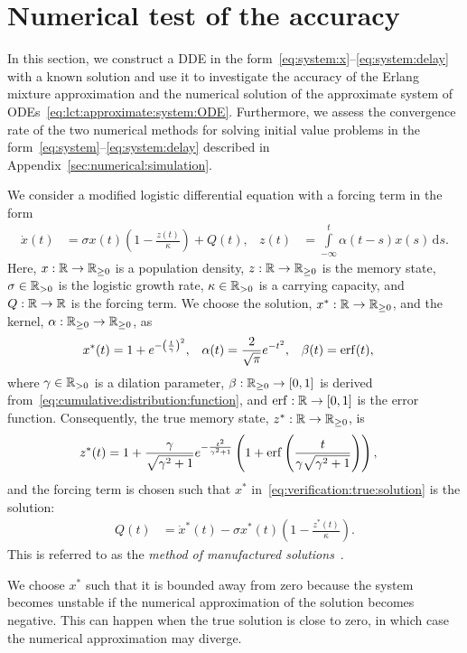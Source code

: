 \section{Numerical test of the accuracy}\label{sec:ex:conv}
In this section, we construct a DDE in the form~\eqref{eq:system:x}--\eqref{eq:system:delay} with a known solution and use it to investigate the accuracy of the Erlang mixture approximation and the numerical solution of the approximate system of ODEs~\eqref{eq:lct:approximate:system:ODE}. Furthermore, we assess the convergence rate of the two numerical methods for solving initial value problems in the form~\eqref{eq:system}--\eqref{eq:system:delay} described in Appendix~\ref{sec:numerical:simulation}.

We consider a modified logistic differential equation with a forcing term in the form
%
\begin{align}\label{eq:logistic:differential:equation}
	\dot x(t) &= \sigma x(t) \left(1 - \frac{z(t)}{\kappa}\right) + Q(t), &
	z(t) &= \int\limits_{-\infty}^{t} \alpha(t - s) x(s)\,\mathrm ds.
\end{align}
%
Here, $x: \mathbb{R} \rightarrow \mathbb{R}_{\geq 0}$ is a population density, $z: \mathbb{R} \rightarrow \mathbb{R}_{\geq 0}$ is the memory state, $\sigma \in \mathbb{R}_{> 0}$ is the logistic growth rate, $\kappa \in \mathbb{R}_{> 0}$ is a carrying capacity, and $Q: \mathbb{R} \rightarrow \mathbb{R}$ is the forcing term.
%
We choose the solution, $x^*: \mathbb{R} \rightarrow \mathbb{R}_{\geq 0}$, and the kernel, $\alpha: \mathbb{R}_{\geq 0} \rightarrow \mathbb{R}_{\geq 0}$, as
%
\begin{align}\label{eq:verification:true:solution}
	x^*(t) &= 1 + e^{-\left(\frac{t}{\gamma}\right)^2}, &
	\alpha(t) &= \frac{2}{\sqrt{\pi}} e^{-t^2}, &
	\beta (t) &= \operatorname{erf}(t),
\end{align}
%
where $\gamma \in \mathbb{R}_{> 0}$ is a dilation parameter, $\beta: \mathbb{R}_{\geq 0} \rightarrow [0, 1]$ is derived from~\eqref{eq:cumulative:distribution:function}, and $\operatorname{erf}: \mathbb{R} \rightarrow [0, 1]$ is the error function.
%
Consequently, the true memory state, $z^*: \mathbb{R} \rightarrow \mathbb{R}_{\geq 0}$, is
%
\begin{align}
	z^*(t) &= 1 + \frac{\gamma}{\sqrt{\gamma^2 + 1}} e^{-\frac{t^2}{\gamma^2 + 1}} \left(1 + \operatorname{erf}\left(\frac{t}{\gamma \sqrt{\gamma^2 + 1}}\right)\right),
\end{align}
%
and the forcing term is chosen such that $x^*$ in~\eqref{eq:verification:true:solution} is the solution:
%
\begin{align}
	Q(t)
	&= \dot x^*(t) - \sigma x^*(t) \left(1 - \frac{z^*(t)}{\kappa}\right).
\end{align}
%
This is referred to as the \emph{method of manufactured solutions}~\cite{Roache:2002}.
%
\begin{remark}
	We choose $x^*$ such that it is bounded away from zero because the system becomes unstable if the numerical approximation of the solution becomes negative. This can happen when the true solution is close to zero, in which case the numerical approximation may diverge.
\end{remark}

